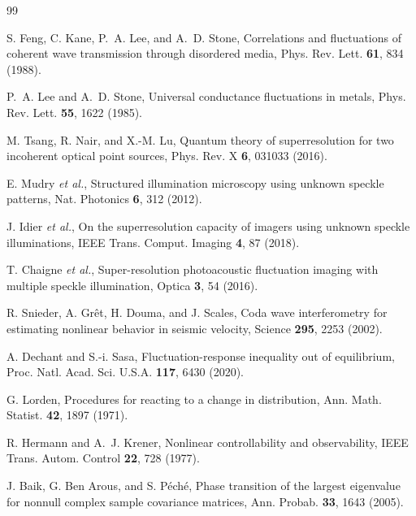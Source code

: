 \documentclass[aps,prl,reprint,groupedaddress,superscriptaddress,floatfix]{revtex4-2}
\begin{document}
\begin{thebibliography}{99}

S. Feng, C. Kane, P.~A. Lee, and A.~D. Stone,
Correlations and fluctuations of coherent wave transmission through disordered
media, Phys. Rev. Lett. \textbf{61}, 834 (1988).

P.~A. Lee and A.~D. Stone,
Universal conductance fluctuations in metals, Phys. Rev. Lett. \textbf{55}, 1622
(1985).

M. Tsang, R. Nair, and X.-M. Lu,
Quantum theory of superresolution for two incoherent optical point sources,
Phys. Rev. X \textbf{6}, 031033 (2016).

E. Mudry \textit{et al.},
Structured illumination microscopy using unknown speckle patterns,
Nat. Photonics \textbf{6}, 312 (2012).

J. Idier \textit{et al.},
On the superresolution capacity of imagers using unknown speckle illuminations,
IEEE Trans. Comput. Imaging \textbf{4}, 87 (2018).

T. Chaigne \textit{et al.},
Super-resolution photoacoustic fluctuation imaging with multiple speckle
illumination, Optica \textbf{3}, 54 (2016).

R. Snieder, A. Gr\^et, H. Douma, and J. Scales,
Coda wave interferometry for estimating nonlinear behavior in seismic velocity,
Science \textbf{295}, 2253 (2002).

A. Dechant and S.-i. Sasa,
Fluctuation-response inequality out of equilibrium,
Proc. Natl. Acad. Sci. U.S.A. \textbf{117}, 6430 (2020).

G. Lorden,
Procedures for reacting to a change in distribution,
Ann. Math. Statist. \textbf{42}, 1897 (1971).

R. Hermann and A.~J. Krener,
Nonlinear controllability and observability,
IEEE Trans. Autom. Control \textbf{22}, 728 (1977).

J. Baik, G. Ben Arous, and S. P\'ech\'e,
Phase transition of the largest eigenvalue for nonnull complex sample covariance
matrices, Ann. Probab. \textbf{33}, 1643 (2005).

\end{thebibliography}
\end{document}
